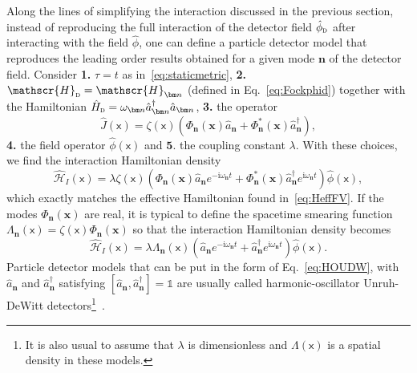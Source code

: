 \documentclass[letterpaper,12pt,titlepage,oneside,final]{book}
\newcommand{\openone}{\mathds{1}}
\newcommand{\mf}{\mathsf}%
\newcommand{\ii}{\mathrm{i}}
\newcommand{\tc}[1]{\textsc{#1}}
\begin{document}
Along the lines of simplifying the interaction discussed in the previous section, instead of reproducing the full interaction of the detector field $\hat{\phi}_\tc{d}$ after interacting with the field $\hat{\phi}$, one can define a particle detector model that reproduces the leading order results obtained for a given mode $\bm n$ of the detector field. Consider \textbf{1.} $\tau = t$ as in~\eqref{eq:staticmetric}, \textbf{2.} $\mathscr{H}_\tc{d} = \mathscr{H}_{\bm n}$ (defined in Eq.~\eqref{eq:Fockphid}) together with the Hamiltonian $\hat{H}_{\tc{d}} = \omega_{\bm n} \hat{a}_{\bm n}^\dagger \hat{a}_{\bm n}$, \textbf{3.} the operator
\begin{equation}\label{eq:HeisenbergPD}
    \hat{J}(\mf x) = \zeta(\mf x) (\Phi_{\bm n}(\bm x)\hat{a}_{\bm n} + \Phi_{\bm n}^*(\bm x)\hat{a}_{\bm n}^\dagger),
\end{equation}
\textbf{4.} the field operator $\hat{\phi}(\mf x)$ and $\textbf{5.}$ the coupling constant $\lambda$. With these choices, we find the interaction Hamiltonian density
\begin{equation}
    \hat{\mathcal{H}}_I(\mf x) = \lambda \zeta(\mf x) (\Phi_{\bm n}(\bm x)\hat{a}_{\bm n} e^{- \ii \omega_{\bm n} t} + \Phi_{\bm n}^*(\bm x)\hat{a}_{\bm n}^\dagger e^{\ii \omega_{\bm n} t})\hat{\phi}(\mf x),
\end{equation}
which exactly matches the effective Hamiltonian found in~\eqref{eq:HeffFV}. If the modes $\Phi_{\bm n}(\bm x)$ are real, it is typical to define the spacetime smearing function $\Lambda_{\bm n}(\mf x) = \zeta(\mf x)\Phi_{\bm n}(\bm x)$ so that the interaction Hamiltonian density becomes
\begin{equation}\label{eq:HOUDW}
    \hat{\mathcal{H}}_I(\mf x) = \lambda \Lambda_{\bm n}(\mf x)(\hat{a}_{\bm n} e^{- \ii \omega_{\bm n} t} + \hat{a}_{\bm n}^\dagger e^{\ii \omega_{\bm n} t})\hat{\phi}(\mf x).
\end{equation}
Particle detector models that can be put in the form of Eq.~\eqref{eq:HOUDW}, with $\hat{a}_{\bm n}$ and $\hat{a}_{\bm n}^\dagger$ satisfying $[\hat{a}_{\bm n},\hat{a}_{\bm n}^\dagger] = \openone$ are usually called harmonic-oscillator Unruh-DeWitt detectors\footnote{It is also usual to assume that $\lambda$ is dimensionless and $\Lambda(\mf x)$ is a spatial density in these models.}~\cite{BeiLokHOUDW1994,CharisHO2020,HODan2021,EricksonZero,MariaContinuous}.
\end{document}
